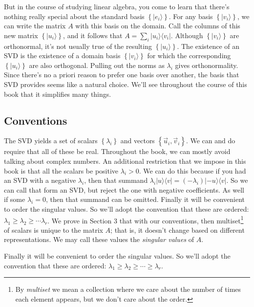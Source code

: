 \documentclass{amsbook}
\begin{document}
But in the course of studying linear algebra, you come to learn that there's nothing really special about the standard basis $\left\{|e_i\rangle\right\}$.  For any basis $\left\{| v _i\rangle\right\}$, we can write the matrix $A$ with this basis on the domain.  Call the columns of this new matrix $\left\{| u _i\rangle\right\}$, and it follows that $A=\sum_i| u _i\rangle\langle v _i|$.  Although $\left\{| v _i\rangle\right\}$ are orthonormal, it's not usually true of the resulting $\left\{| u _i\rangle\right\}$.  The existence of an SVD is the existence of a domain basis $\left\{| v _i\rangle\right\}$ for which the corresponding $\left\{| u _i\rangle\right\}$ are also orthogonal.  Pulling out the norms as $\lambda_i$ gives orthonormality.  Since there's no a priori reason to prefer one basis over another, the basis that SVD provides seems like a natural choice.  We'll see throughout the course of this book that it simplifies many things.

\subsection{Conventions}

The SVD yields a set of scalars $\left\{\lambda_i\right\}$ and vectors $\left\{\vec u_i, \vec v_i\right\}$.  We can and do require that all of these be real.  Throughout the book, we can mostly avoid talking about complex numbers.  An additional restriction that we impose in this book is that all the scalars be positive $\lambda_i>0$.  We can do this because if you had an SVD with a negative $\lambda_i$, then that summand $\lambda_i|u\rangle\langle v|=(-\lambda_i)|-u\rangle\langle v|$.  So we can call that form an SVD, but reject the one with negative coefficients.  As well if some $\lambda_i=0$, then that summand can be omitted.  Finally it will be convenient to order the singular values.  So we'll adopt the convention that these are ordered:  $\lambda_1\geq\lambda_2\geq\cdots\lambda_r$.  We prove in Section 3 that with our conventions, then multiset\footnote{By {\em multiset} we mean a collection where we care about the number of times each element appears, but we don't care about the order.} of scalars is unique to the matrix $A$; that is, it doesn't change based on different representations.  We may call these values the {\em singular values} of $A$.

Finally it will be convenient to order the singular values.  So we'll adopt the convention that these are ordered:  $\lambda_1\geq\lambda_2\geq\cdots\geq\lambda_r$.
\end{document}
